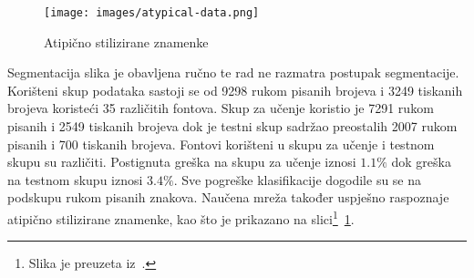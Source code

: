 \begin{figure}[htb]
    \centering
    \texttt{[image: images/atypical-data.png]}
    \caption{Atipično stilizirane znamenke}
    \label{fig:atipicno-stilizirane-znamenke}
\end{figure}
Segmentacija slika je obavljena ručno te rad ne razmatra postupak segmentacije. Korišteni skup podataka sastoji se od
9298 rukom pisanih brojeva i 3249 tiskanih brojeva koristeći 35 različitih fontova. Skup za učenje koristio je 7291
rukom pisanih i 2549 tiskanih brojeva dok je testni skup sadržao preostalih 2007 rukom pisanih i 700 tiskanih brojeva.
Fontovi korišteni u skupu za učenje i testnom skupu su različiti. Postignuta greška na skupu za učenje iznosi $1.1\%$
dok greška na testnom skupu iznosi $3.4\%$. Sve pogreške klasifikacije dogodile su se na podskupu rukom pisanih znakova.
Naučena mreža također uspješno raspoznaje atipično stilizirane znamenke, kao što je prikazano na
slici\footnote{Slika je preuzeta iz\ \citep{leCun1990}.}\ \ref{fig:atipicno-stilizirane-znamenke}.

